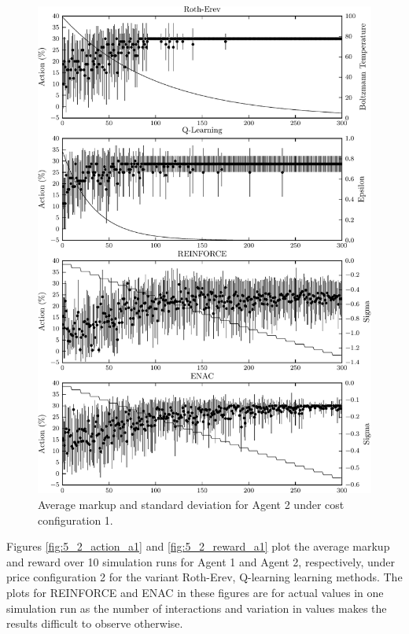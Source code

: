 {	\begin{figure}
	  \centering
	  \includegraphics{figures/fig5_1_action_a2}
	  \caption{Average markup and standard deviation for Agent 2
	  under cost configuration 1.}
	  \label{fig:5_1_action_a2}
	\end{figure}
}{}

Figures \ref{fig:5_2_action_a1} and \ref{fig:5_2_reward_a1} plot the average
markup and reward over 10 simulation runs for Agent 1 and Agent 2,
respectively, under price configuration 2 for the variant Roth-Erev, Q-learning
learning methods.  The plots for REINFORCE and ENAC in these figures are for
actual values in one simulation run as the number of interactions and variation
in values makes the results difficult to observe otherwise.

